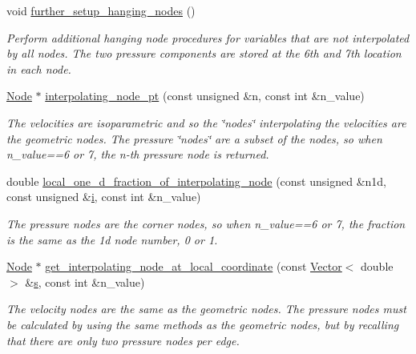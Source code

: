 \begin{DoxyCompactItemize}
void \hyperlink{classoomph_1_1RefineableLinearisedAxisymmetricQTaylorHoodElement_a6675183eb8c772e5a6129be446c8554e}{further\+\_\+setup\+\_\+hanging\+\_\+nodes} ()
\begin{DoxyCompactList}\small\item\em Perform additional hanging node procedures for variables that are not interpolated by all nodes. The two pressure components are stored at the 6th and 7th location in each node. \end{DoxyCompactList}\item 
\hyperlink{classoomph_1_1Node}{Node} $\ast$ \hyperlink{classoomph_1_1RefineableLinearisedAxisymmetricQTaylorHoodElement_a56710b2dff77c32e1ca90de31f699902}{interpolating\+\_\+node\+\_\+pt} (const unsigned \&n, const int \&n\+\_\+value)
\begin{DoxyCompactList}\small\item\em The velocities are isoparametric and so the \char`\"{}nodes\char`\"{} interpolating the velocities are the geometric nodes. The pressure \char`\"{}nodes\char`\"{} are a subset of the nodes, so when n\+\_\+value==6 or 7, the n-\/th pressure node is returned. \end{DoxyCompactList}\item 
double \hyperlink{classoomph_1_1RefineableLinearisedAxisymmetricQTaylorHoodElement_af8d1e9d112563638e422b679247993e8}{local\+\_\+one\+\_\+d\+\_\+fraction\+\_\+of\+\_\+interpolating\+\_\+node} (const unsigned \&n1d, const unsigned \&\hyperlink{cfortran_8h_adb50e893b86b3e55e751a42eab3cba82}{i}, const int \&n\+\_\+value)
\begin{DoxyCompactList}\small\item\em The pressure nodes are the corner nodes, so when n\+\_\+value==6 or 7, the fraction is the same as the 1d node number, 0 or 1. \end{DoxyCompactList}\item 
\hyperlink{classoomph_1_1Node}{Node} $\ast$ \hyperlink{classoomph_1_1RefineableLinearisedAxisymmetricQTaylorHoodElement_a198ab2e61e5ac1b79e46fcd4d3f29a3c}{get\+\_\+interpolating\+\_\+node\+\_\+at\+\_\+local\+\_\+coordinate} (const \hyperlink{classoomph_1_1Vector}{Vector}$<$ double $>$ \&\hyperlink{cfortran_8h_ab7123126e4885ef647dd9c6e3807a21c}{s}, const int \&n\+\_\+value)
\begin{DoxyCompactList}\small\item\em The velocity nodes are the same as the geometric nodes. The pressure nodes must be calculated by using the same methods as the geometric nodes, but by recalling that there are only two pressure nodes per edge. \end{DoxyCompactList}\item 

\end{DoxyCompactItemize}
